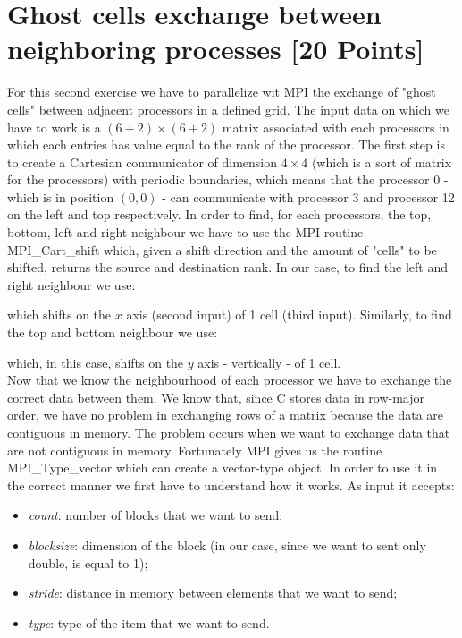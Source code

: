 \documentclass[unicode,11pt,a4paper,oneside,numbers=endperiod,openany]{scrartcl}
\begin{document}
\section{Ghost cells exchange between neighboring processes [20 Points]}
For this second exercise we have to parallelize wit MPI the exchange of "ghost cells" between adjacent processors in a defined grid. The input data on which we have to work is a $(6+2)\times(6+2)$ matrix associated with each processors in which each entries has value equal to the rank of the processor. 
The first step is to create a Cartesian communicator of dimension $4\times 4$ (which is a sort of matrix for the processors) with periodic boundaries, which means that the processor 0 - which is in position $(0,0)$ - can communicate with processor 3 and processor 12 on the left and top respectively. In order to find, for each processors, the top, bottom, left and right neighbour we have to use the MPI routine MPI\_Cart\_shift which, given a shift direction and the amount of "cells" to be shifted, returns the source and destination rank. In our case, to find the left and right neighbour we use:


which shifts on the $x$ axis (second input) of 1 cell (third input). Similarly, to find the top and bottom neighbour we use:

which, in this case, shifts on the $y$ axis - vertically - of 1 cell.\\ Now that we know the neighbourhood of each processor we have to exchange the correct data between them. We know that, since C stores data in row-major order, we have no problem in exchanging rows of a matrix because the data are contiguous in memory. The problem occurs when we want to exchange data that are not contiguous in memory. Fortunately MPI gives us the routine MPI\_Type\_vector which can create a vector-type object. In order to use it in the correct manner we first have to understand how it works. As input it accepts:

\begin{itemize}
	\item \textit{count}: number of blocks that we want to send;
	\item \textit{blocksize}: dimension of the block (in our case, since we want to sent only double, is equal to 1);
	\item \textit{stride}: distance in memory between elements that we want to send;
	\item \textit{type}: type of the item that we want to send.
\end{itemize}
\end{document}
